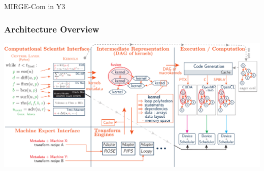 \begin{frame}
    \centering
    \Large
    MIRGE-Com in Y3
\end{frame}

\begin{frame}\frametitle{Architecture Overview}
  \begin{center}
  \includegraphics[width=.95\textwidth]{Figures/controllayer-new.pdf}
  \end{center}
\end{frame}

